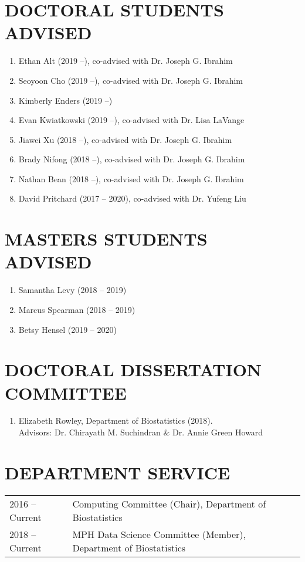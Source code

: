 \documentclass[11pt]{article}
\begin{document}
\section*{\large DOCTORAL STUDENTS ADVISED}
\begin{enumerate}
	\item Ethan Alt (2019 --), co-advised with Dr. Joseph G. Ibrahim	
	\item Seoyoon Cho (2019 --), co-advised with Dr. Joseph G. Ibrahim		
  \item Kimberly Enders (2019 --)
  \item Evan Kwiatkowski (2019 --), co-advised with Dr. Lisa LaVange
	\item Jiawei Xu (2018 --), co-advised with	Dr.	Joseph G. Ibrahim
	\item Brady Nifong (2018 --), co-advised with Dr. Joseph G.	Ibrahim
	\item Nathan Bean (2018 --), co-advised with Dr. Joseph G.	Ibrahim		
	\item David Pritchard (2017 -- 2020), co-advised with Dr. Yufeng Liu
\end{enumerate}

\section*{\large MASTERS STUDENTS ADVISED }
\begin{enumerate}
  \item Samantha Levy (2018 -- 2019)
	\item Marcus Spearman (2018 -- 2019)
	\item Betsy Hensel (2019 -- 2020)
\end{enumerate}

\section*{\large DOCTORAL DISSERTATION COMMITTEE}
\begin{enumerate}
\item Elizabeth Rowley, Department of Biostatistics (2018).  \\
      Advisors:  Dr. Chirayath M. Suchindran $\&$ Dr. Annie Green Howard	%
\end{enumerate}

\section*{\large \bf DEPARTMENT SERVICE}
\begin{tabular}[!h]{p{3cm}p{14cm}}
2016 -- Current & Computing Committee (Chair), Department of Biostatistics\\  
2018 -- Current & MPH Data Science Committee (Member), Department of Biostatistics\\  
\end{tabular}
\end{document}

